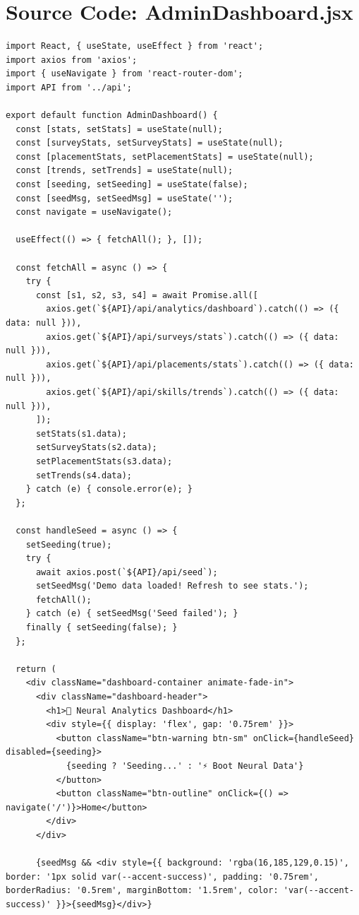 \documentclass[12pt,a4paper]{report}
\begin{document}
\section*{Source Code: AdminDashboard.jsx}
\begin{verbatim}
import React, { useState, useEffect } from 'react';
import axios from 'axios';
import { useNavigate } from 'react-router-dom';
import API from '../api';

export default function AdminDashboard() {
  const [stats, setStats] = useState(null);
  const [surveyStats, setSurveyStats] = useState(null);
  const [placementStats, setPlacementStats] = useState(null);
  const [trends, setTrends] = useState(null);
  const [seeding, setSeeding] = useState(false);
  const [seedMsg, setSeedMsg] = useState('');
  const navigate = useNavigate();

  useEffect(() => { fetchAll(); }, []);

  const fetchAll = async () => {
    try {
      const [s1, s2, s3, s4] = await Promise.all([
        axios.get(`${API}/api/analytics/dashboard`).catch(() => ({ data: null })),
        axios.get(`${API}/api/surveys/stats`).catch(() => ({ data: null })),
        axios.get(`${API}/api/placements/stats`).catch(() => ({ data: null })),
        axios.get(`${API}/api/skills/trends`).catch(() => ({ data: null })),
      ]);
      setStats(s1.data);
      setSurveyStats(s2.data);
      setPlacementStats(s3.data);
      setTrends(s4.data);
    } catch (e) { console.error(e); }
  };

  const handleSeed = async () => {
    setSeeding(true);
    try {
      await axios.post(`${API}/api/seed`);
      setSeedMsg('Demo data loaded! Refresh to see stats.');
      fetchAll();
    } catch (e) { setSeedMsg('Seed failed'); }
    finally { setSeeding(false); }
  };

  return (
    <div className="dashboard-container animate-fade-in">
      <div className="dashboard-header">
        <h1>🧠 Neural Analytics Dashboard</h1>
        <div style={{ display: 'flex', gap: '0.75rem' }}>
          <button className="btn-warning btn-sm" onClick={handleSeed} disabled={seeding}>
            {seeding ? 'Seeding...' : '⚡ Boot Neural Data'}
          </button>
          <button className="btn-outline" onClick={() => navigate('/')}>Home</button>
        </div>
      </div>

      {seedMsg && <div style={{ background: 'rgba(16,185,129,0.15)', border: '1px solid var(--accent-success)', padding: '0.75rem', borderRadius: '0.5rem', marginBottom: '1.5rem', color: 'var(--accent-success)' }}>{seedMsg}</div>}


\end{verbatim}
\end{document}
